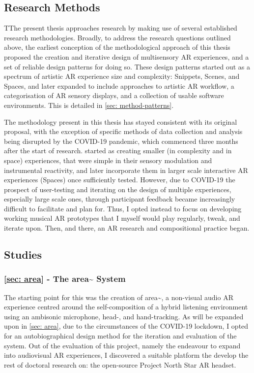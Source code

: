 \subsection{Research Methods}\label{sec: method-outline-methods}
TThe present thesis approaches research by making use of several established research methodologies. Broadly, to address the research questions outlined above, the earliest conception of the methodological approach of this thesis proposed the creation and iterative design of multisensory AR experiences, and a set of reliable design patterns for doing so. These design patterns started out as a spectrum of artistic AR experience size and complexity: Snippets, Scenes, and Spaces, and later expanded to include approaches to artistic AR workflow, a categorisation of AR sensory displays, and a collection of usable software environments. This is detailed in \autoref{sec: method-patterns}. 

The methodology present in this thesis has stayed consistent with its original proposal, with the exception of specific methods of data collection and analysis being disrupted by the COVID-19 pandemic, which commenced three months after the start of research. started as creating smaller (in complexity and in space) experiences, that were simple in their sensory modulation and instrumental reactivity, and later incorporate them in larger scale interactive AR experiences (Spaces) once sufficiently tested. However, due to COVID-19 the prospect of user-testing and iterating on the design of multiple experiences, especially large scale ones, through participant feedback became increasingly difficult to facilitate and plan for. Thus, I opted instead to focus on developing working musical AR prototypes that I myself would play regularly, tweak, and iterate upon. Then, and there, an AR research and compositional practice began.

\subsection{Studies}
\subsubsection{\autoref{sec: area} -  The area\textasciitilde{} System}
The starting point for this was the creation of area\textasciitilde{}, a non-visual audio AR experience centred around the self-composition of a hybrid listening environment using an ambisonic microphone, head-, and hand-tracking. As will be expanded upon in \autoref{sec: area}, due to the circumstances of the COVID-19 lockdown, I opted for an autobiographical design method for the iteration and evaluation of the system. Out of the evaluation of this project, namely the endeavour to expand into audiovisual AR experiences, I discovered a suitable platform the develop the rest of doctoral research on: the open-source Project North Star AR headset.

